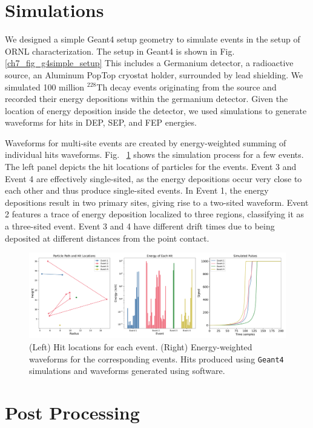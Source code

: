 \section{Simulations}
We designed a simple Geant4 setup geometry to simulate events in the setup of ORNL characterization. The setup in Geant4 is shown in Fig. \ref{ch7_fig_g4simple_setup} This includes a Germanium detector, a radioactive source, an Aluminum PopTop cryostat holder, surrounded by lead shielding. We simulated 100 million $^{228}$Th decay events originating from the source and recorded their energy depositions within the germanium detector. Given the location of energy deposition inside the detector, we used {\siggen} simulations to generate waveforms for hits in DEP, SEP, and FEP energies.

Waveforms for multi-site events are created by energy-weighted summing of individual hits waveforms. Fig. ~\ref{ch7_fig_eng_dep_sim} shows the simulation process for a few events. The left panel depicts the hit locations of particles for the events. Event 3 and Event 4 are effectively single-sited, as the energy depositions occur very close to each other and thus produce single-sited events. In Event 1, the energy depositions result in two primary sites, giving rise to a two-sited waveform. Event 2 features a trace of energy deposition localized to three regions, classifying it as a three-sited event. Event 3 and 4 have different drift times due to being deposited at different distances from the point contact.

\begin{figure}[htb!]
    \includegraphics[width=0.99\linewidth,trim={1pc 0pc 1pc 0pc},clip]{ch7/figs/hit_sims.pdf}
    \caption{(Left) Hit locations for each event. (Right) Energy-weighted waveforms for the corresponding events. Hits produced using \texttt{Geant4} simulations and waveforms generated using {\siggen} software.}
   \label{ch7_fig_eng_dep_sim}
\end{figure}


\section{Post Processing}

